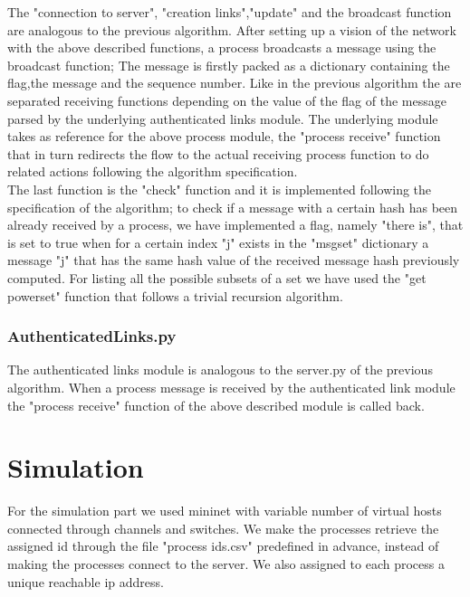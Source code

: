 \documentclass[12pt]{article}
\begin{document}
The "connection to server", "creation links","update" and the broadcast function are analogous to the previous algorithm. After setting up a vision of the network with the above described functions, a process broadcasts a message using the broadcast function; The message is firstly packed as a dictionary containing the flag,the message and the sequence number. Like in the previous algorithm the are separated receiving functions depending on the value of the flag of the message parsed by the underlying authenticated links module. The underlying module takes as reference for the above process module, the "process receive" function that in turn redirects the flow to the actual receiving process function to do related actions following the algorithm specification.\\
The last function is the "check" function and it is implemented following the specification of the algorithm; to check if a message with a certain hash has been already received by a process, we have implemented a flag, namely "there is", that is set to true when for a certain index "j" exists in the "msgset" dictionary a message "j" that has the same hash value of the received message hash previously computed. For listing all the possible subsets of a set we have used the "get powerset" function that follows a trivial recursion algorithm. \\
\subsubsection{AuthenticatedLinks.py}
The authenticated links module is analogous to the server.py of the previous algorithm.   When a process message is received by the authenticated link module the "process receive" function of the above described module is called back. \\

\newpage

\section{Simulation}
For the simulation part we used mininet with variable number of virtual hosts connected through channels and switches. We make the processes retrieve the assigned id through the file "process ids.csv" predefined in advance, instead of making the processes connect to the server. We also assigned to each process a unique reachable ip address. \\
\\
\end{document}
